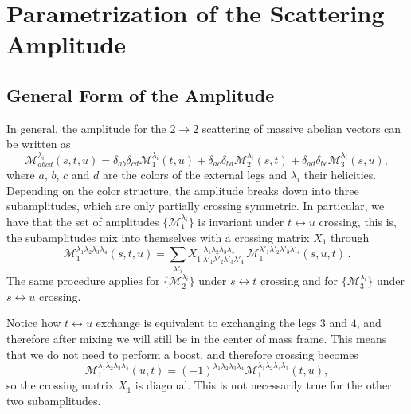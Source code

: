 
\section{Parametrization of the Scattering Amplitude}

\subsection{General Form of the Amplitude}

In general, the amplitude for the $2 \rightarrow 2$ scattering of massive abelian vectors can be written as 
\begin{equation}
    \mathcal{M}_{abcd}^{\lambda_i}(s, t, u) = \delta_{ab} \delta_{cd} \mathcal{M}_1^{\lambda_i}(t, u)  + \delta_{ac} \delta_{bd} \mathcal{M}_2^{\lambda_i}(s, t) +\delta_{ad} \delta_{bc} \mathcal{M}_3^{\lambda_i}(s, u),
\end{equation}
where $a$, $b$, $c$ and $d$ are the colors of the external legs and $\lambda_i$ their helicities. Depending on the color structure, the amplitude breaks down into three subamplitudes, which are only partially crossing symmetric. In particular, we have that the set of amplitudes $\{ \mathcal{M}_1^{\lambda_i} \}$ is invariant under $t \leftrightarrow u$ crossing, this is, the subamplitudes mix into themselves with a crossing matrix $X_1$ through 
\[
\mathcal{M}_{1}^{\lambda_1 \lambda_2 \lambda_3 \lambda_4}(s, t, u)
=
\sum_{\lambda'_i}
X^{\; \; \; \lambda_1 \lambda_2 \lambda_3 \lambda_4}_{1 \; \lambda'_1 \lambda'_2 \lambda'_3 \lambda'_4}
\,
\mathcal{M}_1^{\lambda'_1 \lambda'_2 \lambda'_3 \lambda'_4}(s, u,t)\,.
\]
The same procedure applies for $\{\mathcal{M}_2^{\lambda_i} \}$ under $s \leftrightarrow t$ crossing and for $\{\mathcal{M}_3^{\lambda_i} \}$ under $s \leftrightarrow u$ crossing.

Notice how $t \leftrightarrow u$ exchange is equivalent to exchanging the legs $3$ and $4$, and therefore after mixing we will still be in the center of mass frame. This means that we do not need to perform a boost, and therefore crossing becomes 
\begin{equation}
    \mathcal{M}_1^{\lambda_1 \lambda_2 \lambda_3 \lambda_4} (u, t) = (-1)^{\lambda_1 \lambda_2 \lambda_3 \lambda_4}  \mathcal{M}_1^{\lambda_1 \lambda_2 \lambda_4 \lambda_3} (t, u),
    \label{eq:noboost}
\end{equation}
so the crossing matrix $X_1$ is diagonal. This is not necessarily true for the other two subamplitudes.

